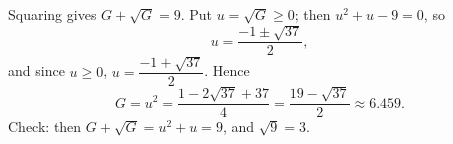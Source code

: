 Squaring gives $G+\sqrt G=9$. Put $u=\sqrt G\ge0$; then $u^2+u-9=0$, so
\[u=\dfrac{-1\pm\sqrt{37}}{2},\]
and since $u\ge0$, $u=\dfrac{-1+\sqrt{37}}{2}$. Hence
\[G=u^2=\dfrac{1-2\sqrt{37}+37}{4}=\boxed{\dfrac{19-\sqrt{37}}{2}}\approx6.459 .\]
Check: then $G+\sqrt G=u^2+u=9$, and $\sqrt9=3$.
